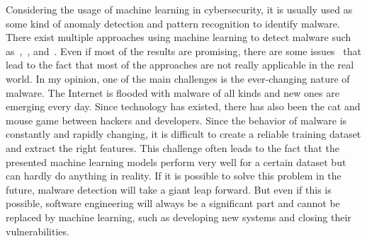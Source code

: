 \documentclass[11pt,a4paper]{article}
\begin{document}
Considering the usage of machine learning in cybersecurity, it is usually used as some kind of anomaly detection and pattern recognition to identify malware. There exist multiple approaches using machine learning to detect malware such as~\cite{sahs2012machine},~\cite{gavriluct2009malware}, and~\cite{santos2013opem}. Even if most of the results are promising, there are some issues~\cite{liu2020review} that lead to the fact that most of the approaches are not really applicable in the real world. In my opinion, one of the main challenges is the ever-changing nature of malware. The Internet is flooded with malware of all kinds and new ones are emerging every day. Since technology has existed, there has also been the cat and mouse game between hackers and developers. Since the behavior of malware is constantly and rapidly changing, it is difficult to create a reliable training dataset and extract the right features. This challenge often leads to the fact that the presented machine learning models perform very well for a certain dataset but can hardly do anything in reality. If it is possible to solve this problem in the future, malware detection will take a giant leap forward. But even if this is possible, software engineering will always be a significant part and cannot be replaced by machine learning, such as developing new systems and closing their vulnerabilities.


\end{document}
